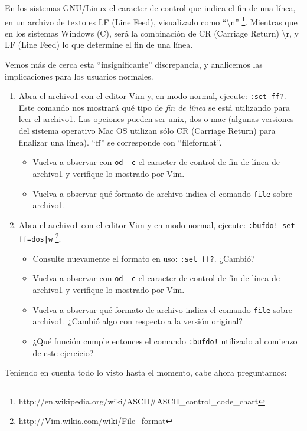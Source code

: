 \documentclass[12pt]{article}
\begin{document}
En los sistemas GNU/Linux el caracter de control que indica el fin de una línea, en 
un archivo de texto es LF (Line Feed), visualizado como ``\textbackslash n''
\footnote{http://en.wikipedia.org/wiki/ASCII\#ASCII\_control\_code\_chart}. Mientras
que en los sistemas Windows (C), será la combinación de CR (Carriage Return) \textbackslash r, y 
LF (Line Feed) lo que determine el fin de una línea. 

Vemos más de cerca esta ``insignificante'' discrepancia, y analicemos las implicaciones
para los usuarios normales. 

\begin{enumerate}
\item Abra el archivo1 con el editor Vim y, en modo normal, ejecute: {\tt :set ff?}. Este 
comando nos mostrará qué tipo de {\it fin de línea} se está utilizando para leer el archivo1. 
Las opciones pueden ser unix, dos o mac (algunas versiones del sistema operativo Mac OS
utilizan sólo CR (Carriage Return) para finalizar una línea). ``ff'' se corresponde con 
``fileformat''.
	\begin{itemize}
	\item Vuelva a observar con {\tt od -c} el caracter de control de fin de línea de archivo1 y
	verifique lo mostrado por Vim. 
	\item Vuelva a observar qué formato de archivo indica el comando {\tt file} sobre 
	archivo1. 
	\end{itemize} 
\item Abra el archivo1 con el editor Vim y en modo normal, ejecute: {\tt :bufdo! set ff=dos|w} 
\footnote{http://Vim.wikia.com/wiki/File\_format}. 
	\begin{itemize}
	\item Consulte nuevamente el formato en uso: {\tt :set ff?}. ¿Cambió?
	\item Vuelva a observar con {\tt od -c} el caracter de control de fin de línea de archivo1 y
	verifique lo mostrado por Vim. 
	\item Vuelva a observar qué formato de archivo indica el comando {\tt file} sobre 
	archivo1. ¿Cambió algo con respecto a la versión original? 
	\item ¿Qué función cumple entonces el comando {\tt :bufdo!} utilizado al comienzo de este 
	ejercicio?
	\end{itemize} 
\end{enumerate}

Teniendo en cuenta todo lo visto hasta el momento, cabe ahora preguntarnos: 
\end{document}
